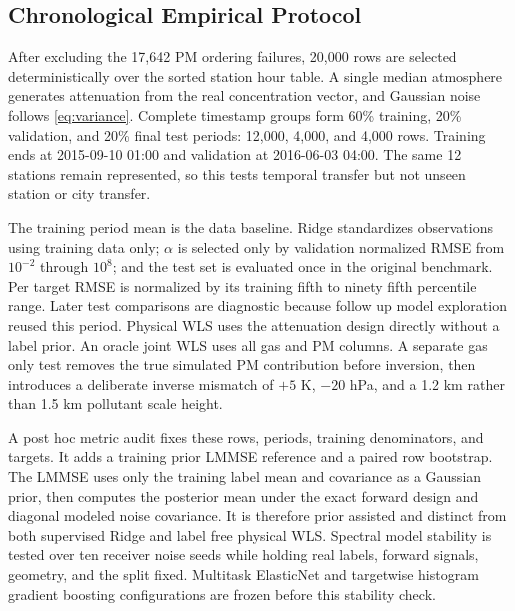 \documentclass[conference]{IEEEtran}
\begin{document}
\subsection{Chronological Empirical Protocol}

After excluding the 17,642 PM ordering failures, 20,000 rows are selected deterministically over the sorted station hour table. A single median atmosphere generates attenuation from the real concentration vector, and Gaussian noise follows \eqref{eq:variance}. Complete timestamp groups form 60\% training, 20\% validation, and 20\% final test periods: 12,000, 4,000, and 4,000 rows. Training ends at 2015-09-10 01:00 and validation at 2016-06-03 04:00. The same 12 stations remain represented, so this tests temporal transfer but not unseen station or city transfer.

The training period mean is the data baseline. Ridge standardizes observations using training data only; $\alpha$ is selected only by validation normalized RMSE from $10^{-2}$ through $10^8$; and the test set is evaluated once in the original benchmark. Per target RMSE is normalized by its training fifth to ninety fifth percentile range. Later test comparisons are diagnostic because follow up model exploration reused this period. Physical WLS uses the attenuation design directly without a label prior. An oracle joint WLS uses all gas and PM columns. A separate gas only test removes the true simulated PM contribution before inversion, then introduces a deliberate inverse mismatch of $+5$ K, $-20$ hPa, and a 1.2 km rather than 1.5 km pollutant scale height.

A post hoc metric audit fixes these rows, periods, training denominators, and targets. It adds a training prior LMMSE reference and a paired row bootstrap. The LMMSE uses only the training label mean and covariance as a Gaussian prior, then computes the posterior mean under the exact forward design and diagonal modeled noise covariance. It is therefore prior assisted and distinct from both supervised Ridge and label free physical WLS. Spectral model stability is tested over ten receiver noise seeds while holding real labels, forward signals, geometry, and the split fixed. Multitask ElasticNet and targetwise histogram gradient boosting configurations are frozen before this stability check.
\end{document}
